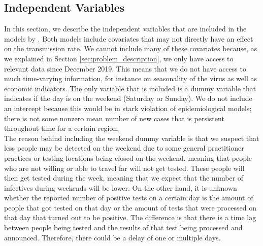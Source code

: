 \documentclass[12pt]{article}
\begin{document}
	\subsection{Independent Variables} \label{subsec:regressor_data}
	In this section, we describe the independent variables that are included in the models by \textcite{adda2016economic}. Both models include covariates that may not directly have an effect on the transmission rate. We cannot include many of these covariates because, as we explained in Section \ref{sec:problem_description}, %
	we only have access to relevant data since December 2019. This means that we do not have access to %
    much time-varying information, for instance on seasonality of the virus as well as economic indicators. %
	The only variable that is included is a dummy variable that indicates if the day is on the weekend (Saturday or Sunday). We do not include an intercept because this would be in stark violation of epidemiological models; there is not some nonzero mean number of new cases that is persistent throughout time for a certain region. \\
	
	The reason behind including the weekend dummy variable is that we suspect that less people may be detected on the weekend due to some general practitioner practices or testing locations being closed on the weekend, meaning that people who are not willing or able to travel far will not get tested. These people will then get tested during the week, meaning that we expect that the number of infectives during weekends will be lower. On the other hand, it is unknown whether the reported number of positive tests on a certain day is the amount of people that got tested on that day or the amount of tests that were processed on that day that turned out to be positive. The difference is that there is a time lag between people being tested and the results of that test being processed and announced. Therefore, there could be a delay of one or multiple days.
	
	
\end{document}
